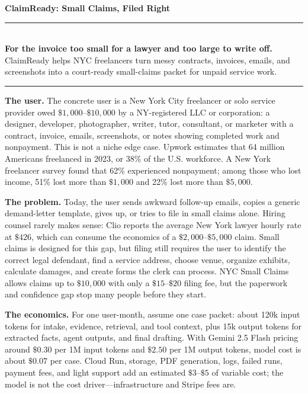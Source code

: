 \documentclass[11pt]{article}
\begin{document}
\pagecolor{white}
\color{claimink}

{\Large\bfseries\color{claimink} ClaimReady: Small Claims, Filed Right}\\[-1pt]
{\color{quietgreen}\rule{\linewidth}{0.8pt}}\\[-3pt]
{\large\bfseries\color{quietgreen} For the invoice too small for a lawyer and too large to write off.}\\[-1pt]
ClaimReady helps NYC freelancers turn messy contracts, invoices, emails, and screenshots into a court-ready small-claims packet for unpaid service work.

{\color{quietgreen}\rule{\linewidth}{0.35pt}}\vspace{-3pt}

{\bfseries The user.} The concrete user is a New York City freelancer or solo service provider owed \(\$1{,}000\)--\(\$10{,}000\) by a NY-registered LLC or corporation: a designer, developer, photographer, writer, tutor, consultant, or marketer with a contract, invoice, emails, screenshots, or notes showing completed work and nonpayment. This is not a niche edge case. Upwork estimates that 64 million Americans freelanced in 2023, or 38\% of the U.S. workforce. A New York freelancer survey found that 62\% experienced nonpayment; among those who lost income, 51\% lost more than \(\$1{,}000\) and 22\% lost more than \(\$5{,}000\).

{\bfseries The problem.} Today, the user sends awkward follow-up emails, copies a generic demand-letter template, gives up, or tries to file in small claims alone. Hiring counsel rarely makes sense: Clio reports the average New York lawyer hourly rate at \(\$426\), which can consume the economics of a \(\$2{,}000\)--\(\$5{,}000\) claim. Small claims is designed for this gap, but filing still requires the user to identify the correct legal defendant, find a service address, choose venue, organize exhibits, calculate damages, and create forms the clerk can process. NYC Small Claims allows claims up to \(\$10{,}000\) with only a \(\$15\)--\(\$20\) filing fee, but the paperwork and confidence gap stop many people before they start.

{\bfseries The economics.} For one user-month, assume one case packet: about 120k input tokens for intake, evidence, retrieval, and tool context, plus 15k output tokens for extracted facts, agent outputs, and final drafting. With Gemini 2.5 Flash pricing around \(\$0.30\) per 1M input tokens and \(\$2.50\) per 1M output tokens, model cost is about \(\$0.07\) per case. Cloud Run, storage, PDF generation, logs, failed runs, payment fees, and light support add an estimated \(\$3\)--\(\$5\) of variable cost; the model is not the cost driver---infrastructure and Stripe fees are.
\end{document}
